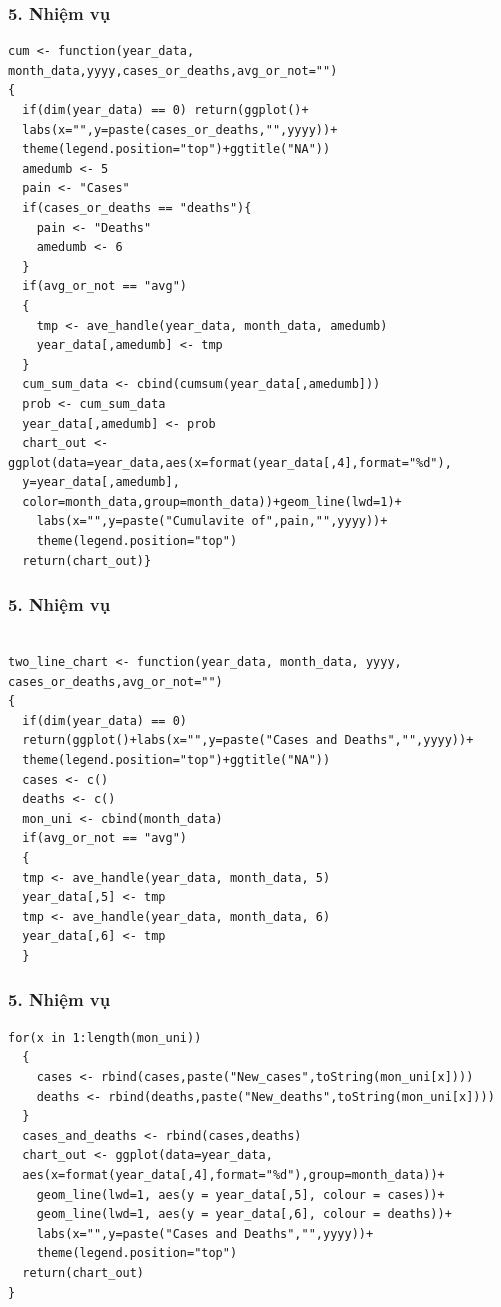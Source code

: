 \documentclass[english,10pt,table]{beamer}
\begin{document}
\begin{frame}[fragile]
\frametitle{5.  Nhiệm vụ}
\lstset{
    title=Function and data for v vi vii viii}
\begin{lstlisting}[frame = single,basicstyle=\tiny]
cum <- function(year_data,
month_data,yyyy,cases_or_deaths,avg_or_not="")
{
  if(dim(year_data) == 0) return(ggplot()+
  labs(x="",y=paste(cases_or_deaths,"",yyyy))+
  theme(legend.position="top")+ggtitle("NA"))
  amedumb <- 5
  pain <- "Cases"
  if(cases_or_deaths == "deaths"){
    pain <- "Deaths"
    amedumb <- 6 
  }
  if(avg_or_not == "avg")
  {
    tmp <- ave_handle(year_data, month_data, amedumb)
    year_data[,amedumb] <- tmp
  }
  cum_sum_data <- cbind(cumsum(year_data[,amedumb]))
  prob <- cum_sum_data
  year_data[,amedumb] <- prob
  chart_out <- ggplot(data=year_data,aes(x=format(year_data[,4],format="%d"),
  y=year_data[,amedumb],
  color=month_data,group=month_data))+geom_line(lwd=1)+
    labs(x="",y=paste("Cumulavite of",pain,"",yyyy))+
    theme(legend.position="top")
  return(chart_out)}
\end{lstlisting}
\end{frame}

\begin{frame}[fragile]
\frametitle{5.  Nhiệm vụ}
\begin{lstlisting}[frame = single,basicstyle=\tiny]

two_line_chart <- function(year_data, month_data, yyyy,
cases_or_deaths,avg_or_not="")
{
  if(dim(year_data) == 0) 
  return(ggplot()+labs(x="",y=paste("Cases and Deaths","",yyyy))+
  theme(legend.position="top")+ggtitle("NA"))
  cases <- c()
  deaths <- c()
  mon_uni <- cbind(month_data)
  if(avg_or_not == "avg")
  {
  tmp <- ave_handle(year_data, month_data, 5)
  year_data[,5] <- tmp
  tmp <- ave_handle(year_data, month_data, 6)
  year_data[,6] <- tmp
  }
\end{lstlisting}
\end{frame}

\begin{frame}[fragile]
\frametitle{5.  Nhiệm vụ}
\begin{lstlisting}[frame = single,basicstyle=\tiny]
for(x in 1:length(mon_uni))
  {
    cases <- rbind(cases,paste("New_cases",toString(mon_uni[x])))
    deaths <- rbind(deaths,paste("New_deaths",toString(mon_uni[x])))
  }
  cases_and_deaths <- rbind(cases,deaths)
  chart_out <- ggplot(data=year_data,
  aes(x=format(year_data[,4],format="%d"),group=month_data))+
    geom_line(lwd=1, aes(y = year_data[,5], colour = cases))+
    geom_line(lwd=1, aes(y = year_data[,6], colour = deaths))+
    labs(x="",y=paste("Cases and Deaths","",yyyy))+
    theme(legend.position="top")
  return(chart_out)
}
\end{lstlisting}
\end{frame}
\end{document}
